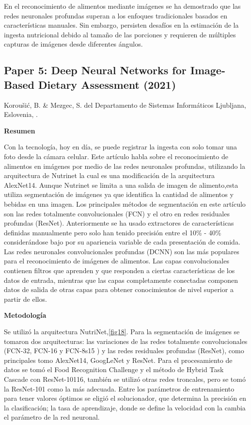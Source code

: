  En el reconocimiento de alimentos mediante imágenes se ha demostrado que las redes neuronales profundas superan a los enfoques tradicionales basados en características manuales. Sin embargo, persisten desafíos en la estimación de la ingesta nutricional debido al tamaño de las porciones y requieren de múltiples capturas de imágenes desde diferentes ángulos.

 \subsection{Paper 5: Deep Neural Networks for Image-Based Dietary Assessment (2021)} 

Koroušić, B. \&  Mezgec, S. del Departamento de Sistemas Informáticos Ljubljana, Eslovenia, \parencite{mezgec2021deep}.

\textbf{Resumen}

\thinspace
Con la tecnología, hoy en día, se puede registrar la ingesta con solo tomar una foto desde la cámara celular. Este artículo habla sobre el reconocimiento de alimentos en imágenes por medio de las redes neuronales profundas, utilizando la arquitectura de Nutrinet la cual es una modificación de la arquitectura AlexNet14. Aunque Nutrinet se limita a una salida de imagen de alimento,esta utiliza segmentación de imágenes ya que identifica la cantidad de alimentos y bebidas en una imagen. Los principales métodos de segmentación en este artículo son las redes totalmente convolucionales (FCN) y el otro en redes residuales profundas (ResNet). Anteriormente se ha usado extractores de características definidas manualmente pero solo han tenido precisión entre el 10\% - 40\% considerándose bajo por su apariencia variable de cada presentación de comida. Las redes neuronales convolucionales profundas (DCNN) son las más populares para el reconocimiento de imágenes de alimentos. Las capas convolucionales contienen filtros que aprenden y que responden a ciertas características de los datos de entrada, mientras que las capas completamente conectadas componen datos de salida de otras capas para obtener conocimientos de nivel superior a partir de ellos. 

\textbf{Metodología}

\thinspace
Se utilizó la arquitectura NutriNet,\ref{fig18}. Para la segmentación de imágenes se tomaron dos arquitecturas: las variaciones de las redes totalmente convolucionales (FCN-32, FCN-16 y FCN-8s15 ) y las redes residuales profundas (ResNet), como principales tomo AlexNet14, GoogLeNet y ResNet. Para el procesamiento de datos se tomó el Food Recognition Challenge y el método de Hybrid Task Cascade con ResNet-10116, también se utilizó otras redes troncales, pero se tomó la ResNet-101 como la más adecuada. Entre los parámetros de entrenamiento para tener valores óptimos se eligió el solucionador, que determina la precisión en la clasificación; la tasa de aprendizaje, donde se define la velocidad con la cambia el parámetro de la red neuronal. 

